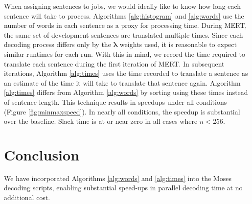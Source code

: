 \documentclass[11pt,letterpaper]{article}
\begin{document}
When assigning sentences to jobs, we would ideally like to know how long each sentence will take to process. Algorithms \ref{alg:histogram} and \ref{alg:words} use the number of words in each sentence as a proxy for processing time. During MERT, the same set of development sentences are translated multiple times. Since each decoding process differs only by the $\bm{\lambda}$ weights used, it is reasonable to expect similar runtimes for each run. With this in mind, we record the time required to translate each sentence during the first iteration of MERT. In subsequent iterations, Algorithm \ref{alg:times} uses the time recorded to translate a sentence as an estimate of the time it will take to translate that sentence again. Algorithm \ref{alg:times} differs from Algorithm \ref{alg:words} by sorting using these times instead of sentence length.
%
This technique results in speedups under all conditions (Figure \ref{fig:minmaxspeed}). In nearly all conditions, the speedup is substantial over the baseline. 
%
Slack time is at or near zero in all cases where $n<256$.
%

\section{Conclusion}
\vspace{-0.1cm}

We have incorporated Algorithms \ref{alg:words} and \ref{alg:times} into 
the Moses decoding scripts,
% 
enabling substantial speed-ups in parallel decoding time at no additional cost.
\end{document}
